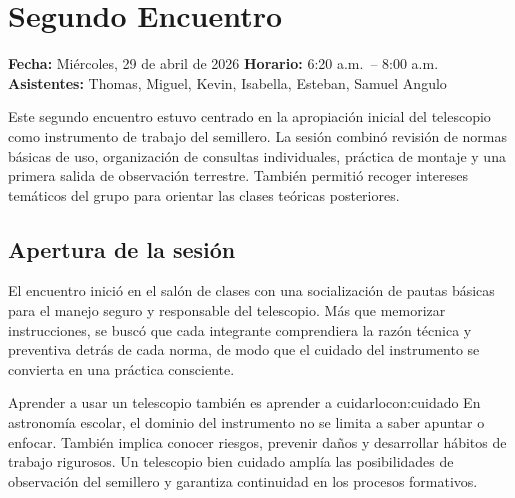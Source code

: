 \chapter{Segundo Encuentro}

\begin{destacado}
    \textbf{Fecha:} Miércoles, 29 de abril de 2026 \quad
    \textbf{Horario:} 6:20 a.m.\ -- 8:00 a.m. \quad
    \textbf{Asistentes:} Thomas, Miguel, Kevin, Isabella, Esteban, Samuel Angulo
\end{destacado}

\medskip

Este segundo encuentro estuvo centrado en la apropiación inicial del telescopio como
instrumento de trabajo del semillero. La sesión combinó revisión de normas básicas de
uso, organización de consultas individuales, práctica de montaje y una primera salida
de observación terrestre. También permitió recoger intereses temáticos del grupo para
orientar las clases teóricas posteriores.

\section{Apertura de la sesión}

El encuentro inició en el salón de clases con una socialización de pautas básicas para
el manejo seguro y responsable del telescopio. Más que memorizar instrucciones, se
buscó que cada integrante comprendiera la razón técnica y preventiva detrás de cada
norma, de modo que el cuidado del instrumento se convierta en una práctica consciente.

\begin{concepto}{Aprender a usar un telescopio también es aprender a cuidarlo}{con:cuidado}
    En astronomía escolar, el dominio del instrumento no se limita a saber apuntar o
    enfocar. También implica conocer riesgos, prevenir daños y desarrollar hábitos de
    trabajo rigurosos. Un telescopio bien cuidado amplía las posibilidades de
    observación del semillero y garantiza continuidad en los procesos formativos.
\end{concepto}

